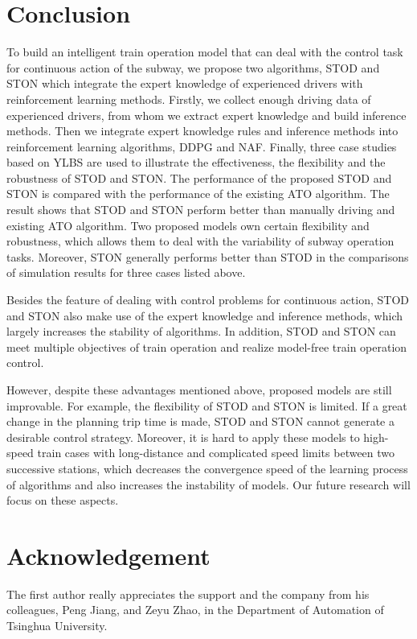 \documentclass[journal]{IEEEtran}
\begin{document}
\section{Conclusion}
To build an intelligent train operation model that can deal with the control task for continuous action of the subway, we propose two algorithms, STOD and STON which integrate the expert knowledge of experienced drivers with reinforcement learning methods. Firstly, we collect enough driving data of experienced drivers, from whom we extract expert knowledge and build inference methods. Then we integrate expert knowledge rules and inference methods into reinforcement learning algorithms, 
DDPG and NAF. Finally, three case studies based on YLBS are used to illustrate the effectiveness, the flexibility and the robustness of STOD and STON. The performance of the proposed STOD and STON is compared with the performance of the existing ATO algorithm. The result shows that STOD and STON perform better than manually driving and existing ATO algorithm. Two proposed models own certain flexibility and robustness, which allows them to deal with the variability of subway operation tasks. Moreover, STON generally performs better than STOD in the comparisons of simulation results for three cases listed above.
\par Besides the feature of dealing with control problems for continuous action, STOD and STON also make use of the expert knowledge and inference methods, which largely increases the stability of algorithms. In addition, STOD and STON can meet multiple objectives of train operation and realize model-free train operation control. 
\par However, despite these advantages mentioned above, proposed models are still improvable. For example, the flexibility of STOD and STON is limited. If a great change in the planning trip time is made, STOD and STON cannot generate a desirable control strategy. Moreover, it is hard to apply these models to high-speed train cases with long-distance and complicated speed limits between two successive stations, which decreases the convergence speed of the learning process of algorithms and also increases the instability of models. Our future research will focus on these aspects.

\section{Acknowledgement}
The first author really appreciates the support and the company from his colleagues, Peng Jiang, and Zeyu Zhao, in the Department of Automation of Tsinghua University.
\end{document}
